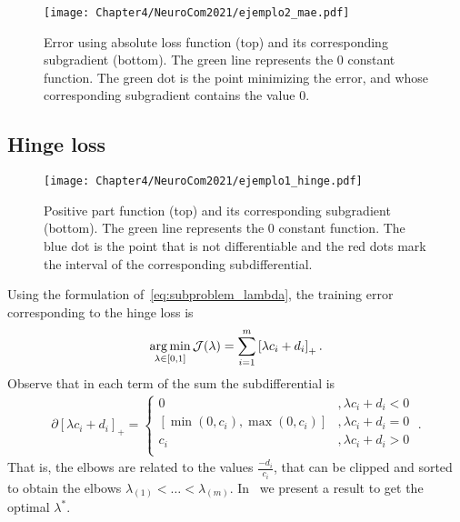 \begin{figure}[t!]
    \centering
    \texttt{[image: Chapter4/NeuroCom2021/ejemplo2\_mae.pdf]}
    \caption{Error using absolute loss function (top) and its corresponding subgradient (bottom). The green line represents the $0$ constant function. The green dot is the point minimizing the error, and whose corresponding subgradient contains the value $0$.}
    \label{fig:abs_error}
\end{figure}

\subsection{Hinge loss}
\begin{figure}[t!]
    \centering
    \texttt{[image: Chapter4/NeuroCom2021/ejemplo1\_hinge.pdf]}
    \caption{Positive part function (top) and its corresponding subgradient (bottom). The green line represents the $0$ constant function. The blue dot is the point that is not differentiable and the red dots mark the interval of the corresponding subdifferential.}
    \label{fig:hinge_loss}
\end{figure}
Using the formulation of~\eqref{eq:subproblem_lambda}, the training error corresponding to the hinge loss is
\begin{equation}
    \label{eq:opt_hinge_l1}
    \argmin_{\lambda \in [0, 1]} \mathcal{J}(\lambda) = \sum_{i=1}^{\npertask} \pospart{\lambda c_i + d_i}.
\end{equation}
Observe that in each term of the sum the subdifferential is 
\begin{align*}
    \partial \left[\lambda c_i + d_i \right]_+ = 
    \begin{cases}
        0 &, \lambda c_i + d_i  < 0 \\
        [\min(0, c_i), \max(0, c_i)] &, \lambda c_i + d_i  = 0 \\
        c_i &, \lambda c_i + d_i  > 0 \\
    \end{cases} \; .
\end{align*}
That is, the elbows are related to the values $\frac{-d_i}{c_i}$, that can be clipped and sorted to obtain the elbows ${\lambda}_{(1)} < \ldots < {\lambda}_{(m)}$.
In~\citet[Proposition 2]{RuizAD21} we present a result to get the optimal $\lambda^*$.
